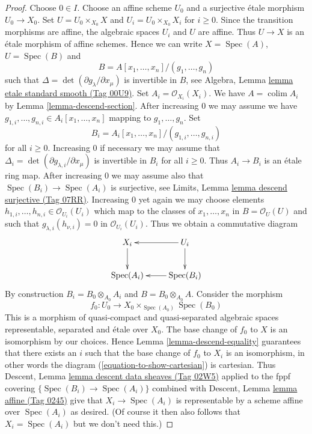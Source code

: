 \documentclass{amsart}
\theoremstyle{plain}
\theoremstyle{definition}
\theoremstyle{remark}
\numberwithin{equation}{subsection}
\def\colim{\mathop{\mathrm{colim}}\nolimits}
\def\Spec{\mathop{\mathrm{Spec}}}
\begin{document}
\begin{proof}
Choose $0 \in I$. Choose an affine scheme $U_0$ and a surjective
\'etale morphism $U_0 \to X_0$. Set $U = U_0 \times_{X_0} X$
and $U_i = U_0 \times_{X_0} X_i$ for $i \geq 0$. Since the transition
morphisms are affine, the algebraic spaces $U_i$ and $U$ are affine.
Thus $U \to X$ is an \'etale morphism of affine schemes. Hence we
can write $X = \Spec(A)$, $U = \Spec(B)$ and
$$
B = A[x_1, \ldots, x_n]/(g_1, \ldots, g_n)
$$
such that $\Delta = \det(\partial g_\lambda/\partial x_\mu)$ is invertible
in $B$, see Algebra, Lemma \href{https://stacks.math.columbia.edu/tag/00U9}{lemma etale standard smooth (Tag 00U9)}.
Set $A_i = \mathcal{O}_{X_i}(X_i)$. We have $A = \colim A_i$ by
Lemma \ref{lemma-descend-section}. After increasing $0$ we may assume
we have $g_{1, i}, \ldots, g_{n, i} \in A_i[x_1, \ldots, x_n]$ mapping to
$g_1, \ldots, g_n$. Set
$$
B_i = A_i[x_1, \ldots, x_n]/(g_{1, i}, \ldots, g_{n, i})
$$
for all $i \geq 0$. Increasing $0$ if necessary we may assume that
$\Delta_i = \det(\partial g_{\lambda, i}/\partial x_\mu)$ is invertible
in $B_i$ for all $i \geq 0$. Thus $A_i \to B_i$ is an \'etale ring map.
After increasing $0$ we may assume also that
$\Spec(B_i) \to \Spec(A_i)$ is surjective, see
Limits, Lemma \href{https://stacks.math.columbia.edu/tag/07RR}{lemma descend surjective (Tag 07RR)}. Increasing
$0$ yet again we may choose elements
$h_{1, i}, \ldots, h_{n, i} \in \mathcal{O}_{U_i}(U_i)$ which map to the
classes of $x_1, \ldots, x_n$ in $B = \mathcal{O}_U(U)$ and such that
$g_{\lambda, i}(h_{\nu, i}) = 0$ in $\mathcal{O}_{U_i}(U_i)$. Thus
we obtain a commutative diagram
\begin{equation}
\label{equation-to-show-cartesian}
\vcenter{
\xymatrix{
X_i \ar[d] & U_i \ar[l] \ar[d] \\
\Spec(A_i) & \Spec(B_i) \ar[l]
}
}
\end{equation}
By construction $B_i = B_0 \otimes_{A_0} A_i$ and
$B = B_0 \otimes_{A_0} A$. Consider the morphism
$$
f_0 : U_0 \longrightarrow X_0 \times_{\Spec(A_0)} \Spec(B_0)
$$
This is a morphism of quasi-compact and quasi-separated algebraic spaces
representable, separated and \'etale over $X_0$. The base change of $f_0$
to $X$ is an isomorphism by our choices. Hence
Lemma \ref{lemma-descend-equality}
guarantees that there exists an $i$ such that the base change of $f_0$
to $X_i$ is an isomorphism, in other words the diagram
(\ref{equation-to-show-cartesian}) is cartesian. Thus
Descent, Lemma \href{https://stacks.math.columbia.edu/tag/02W5}{lemma descent data sheaves (Tag 02W5)}
applied to the fppf covering $\{\Spec(B_i) \to \Spec(A_i)\}$
combined with Descent, Lemma \href{https://stacks.math.columbia.edu/tag/0245}{lemma affine (Tag 0245)}
give that $X_i \to \Spec(A_i)$ is representable by a scheme
affine over $\Spec(A_i)$ as desired. (Of course it then also follows
that $X_i = \Spec(A_i)$ but we don't need this.)
\end{proof}
\end{document}
